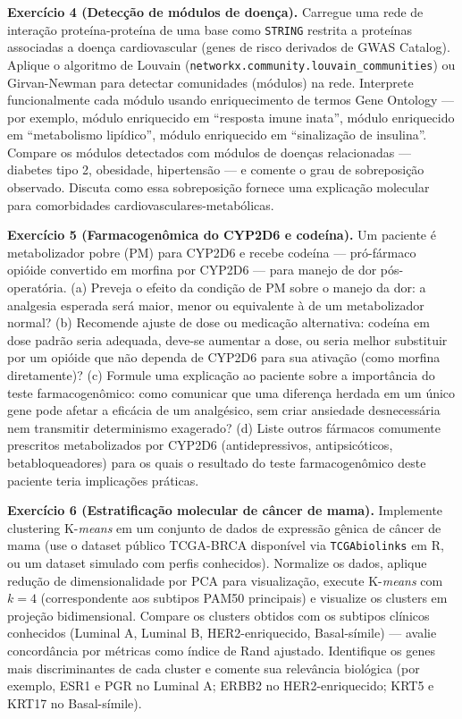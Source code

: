 \textbf{Exercício 4 (Detecção de módulos de doença).} Carregue uma rede de interação proteína-proteína de uma base como \texttt{STRING} restrita a proteínas associadas a doença cardiovascular (genes de risco derivados de GWAS Catalog). Aplique o algoritmo de Louvain (\texttt{networkx.community.louvain\_communities}) ou Girvan-Newman para detectar comunidades (módulos) na rede. Interprete funcionalmente cada módulo usando enriquecimento de termos Gene Ontology --- por exemplo, módulo enriquecido em ``resposta imune inata'', módulo enriquecido em ``metabolismo lipídico'', módulo enriquecido em ``sinalização de insulina''. Compare os módulos detectados com módulos de doenças relacionadas --- diabetes tipo 2, obesidade, hipertensão --- e comente o grau de sobreposição observado. Discuta como essa sobreposição fornece uma explicação molecular para comorbidades cardiovasculares-metabólicas.

\textbf{Exercício 5 (Farmacogenômica do CYP2D6 e codeína).} Um paciente é metabolizador pobre (PM) para CYP2D6 e recebe codeína --- pró-fármaco opióide convertido em morfina por CYP2D6 --- para manejo de dor pós-operatória. (a) Preveja o efeito da condição de PM sobre o manejo da dor: a analgesia esperada será maior, menor ou equivalente à de um metabolizador normal? (b) Recomende ajuste de dose ou medicação alternativa: codeína em dose padrão seria adequada, deve-se aumentar a dose, ou seria melhor substituir por um opióide que não dependa de CYP2D6 para sua ativação (como morfina diretamente)? (c) Formule uma explicação ao paciente sobre a importância do teste farmacogenômico: como comunicar que uma diferença herdada em um único gene pode afetar a eficácia de um analgésico, sem criar ansiedade desnecessária nem transmitir determinismo exagerado? (d) Liste outros fármacos comumente prescritos metabolizados por CYP2D6 (antidepressivos, antipsicóticos, betabloqueadores) para os quais o resultado do teste farmacogenômico deste paciente teria implicações práticas.

\textbf{Exercício 6 (Estratificação molecular de câncer de mama).} Implemente clustering K-\emph{means} em um conjunto de dados de expressão gênica de câncer de mama (use o dataset público TCGA-BRCA disponível via \texttt{TCGAbiolinks} em R, ou um dataset simulado com perfis conhecidos). Normalize os dados, aplique redução de dimensionalidade por PCA para visualização, execute K-\emph{means} com $k = 4$ (correspondente aos subtipos PAM50 principais) e visualize os clusters em projeção bidimensional. Compare os clusters obtidos com os subtipos clínicos conhecidos (Luminal A, Luminal B, HER2-enriquecido, Basal-símile) --- avalie concordância por métricas como índice de Rand ajustado. Identifique os genes mais discriminantes de cada cluster e comente sua relevância biológica (por exemplo, ESR1 e PGR no Luminal A; ERBB2 no HER2-enriquecido; KRT5 e KRT17 no Basal-símile).

